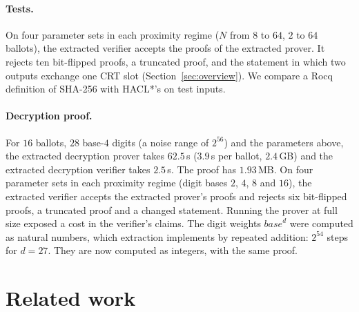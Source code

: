 \documentclass[sigconf,anonymous]{acmart}
\begin{document}
\paragraph{Tests.}
On four parameter sets in each proximity regime ($N$ from $8$ to $64$, $2$ to $64$ ballots), the
extracted verifier accepts the proofs of the extracted prover. It rejects ten bit-flipped proofs, a
truncated proof, and the statement in which two outputs exchange one CRT slot
(Section~\ref{sec:overview}). We compare a Rocq definition of SHA-256 with HACL*'s on test inputs.

\paragraph{Decryption proof.}
For $16$ ballots, $28$ base-$4$ digits (a noise range of $2^{56}$) and the parameters above, the
extracted decryption prover takes $62.5$\,s ($3.9$\,s per ballot, $2.4$\,GB) and the extracted
decryption verifier takes $2.5$\,s. The proof has $1.93$\,MB. On four parameter sets in each
proximity regime (digit bases $2$, $4$, $8$ and $16$), the extracted verifier accepts the extracted
prover's proofs and rejects six bit-flipped proofs, a truncated proof and a changed statement.
Running the prover at full size exposed a cost in the verifier's claims. The digit weights
$\mathit{base}^d$ were computed as natural numbers, which extraction implements by repeated addition:
$2^{54}$ steps for $d=27$. They are now computed as integers, with the same proof.

\section{Related work}
\label{sec:related}
\end{document}
